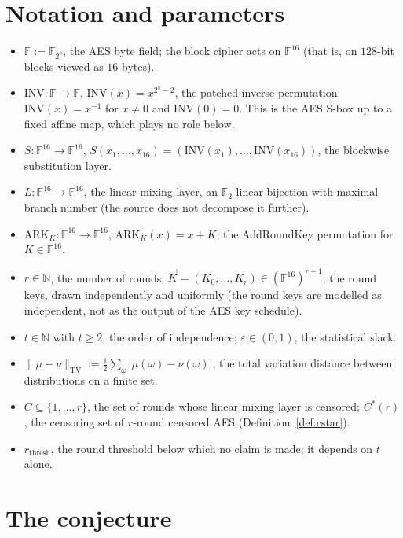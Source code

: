 \documentclass{aicr-conjecture}
\newcommand{\FF}{\mathbb{F}}
\newcommand{\ARK}{\mathrm{ARK}}
\newcommand{\INV}{\mathrm{INV}}
\newcommand{\TV}{\mathrm{TV}}
\newcommand{\rth}{r_{\mathrm{thresh}}}
\newcommand{\vK}{\vec{K}}
\begin{document}
\section{Notation and parameters}\label{sec:notation}

\begin{itemize}
\item $\FF := \FF_{2^8}$, the AES byte field; the block cipher acts on
  $\FF^{16}$ (that is, on $128$-bit blocks viewed as $16$ bytes).
\item $\INV : \FF \to \FF$, $\INV(x) = x^{2^8 - 2}$, the patched inverse
  permutation: $\INV(x) = x^{-1}$ for $x \ne 0$ and $\INV(0) = 0$. This is
  the AES S-box up to a fixed affine map, which plays no role below.
\item $S : \FF^{16} \to \FF^{16}$,
  $S(x_1,\dots,x_{16}) = (\INV(x_1),\dots,\INV(x_{16}))$, the blockwise
  substitution layer.
\item $L : \FF^{16} \to \FF^{16}$, the linear mixing layer, an
  $\FF_2$-linear bijection with maximal branch number (the source does not
  decompose it further).
\item $\ARK_{K} : \FF^{16} \to \FF^{16}$, $\ARK_{K}(x) = x + K$, the
  AddRoundKey permutation for $K \in \FF^{16}$.
\item $r \in \mathbb{N}$, the number of rounds;
  $\vK = (K_0,\dots,K_r) \in (\FF^{16})^{r+1}$, the round keys, drawn
  independently and uniformly (the round keys are modelled as independent,
  not as the output of the AES key schedule).
\item $t \in \mathbb{N}$ with $t \ge 2$, the order of independence;
  $\varepsilon \in (0,1)$, the statistical slack.
\item $\|\mu - \nu\|_{\TV} := \tfrac{1}{2}\sum_{\omega}
  |\mu(\omega) - \nu(\omega)|$, the total variation distance between
  distributions on a finite set.
\item $C \subseteq \{1,\dots,r\}$, the set of rounds whose linear mixing
  layer is censored; $C^{*}(r)$, the censoring set of $r$-round censored
  AES (Definition~\ref{def:cstar}).
\item $\rth$, the round threshold below which no claim is made; it depends
  on $t$ alone.
\end{itemize}

\section{The conjecture}\label{sec:conjectures}
\end{document}
